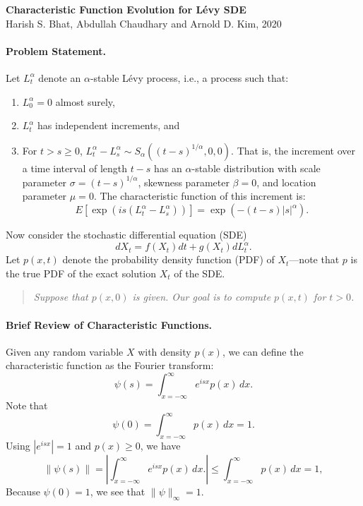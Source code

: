 \documentclass[11pt,letterpaper]{article}
\begin{document}
\begin{center}
\textbf{Characteristic Function Evolution for L\'{e}vy SDE}\\
Harish S. Bhat, Abdullah Chaudhary and Arnold D. Kim, 2020
\end{center}

\paragraph{Problem Statement.} Let $L_t^{\alpha}$ denote an $\alpha$-stable L\'{e}vy process, i.e., a process such that:
\begin{enumerate}
\item $L_0^\alpha = 0$ almost surely,
\item $L_t^\alpha$ has independent increments, and
\item For $t > s \geq 0$, $L_t^\alpha - L_s^\alpha \sim S_\alpha((t-s)^{1/\alpha},0,0)$.  That is, the increment over a time interval of length $t-s$ has an $\alpha$-stable distribution with scale parameter $\sigma = (t-s)^{1/\alpha}$, skewness parameter $\beta=0$, and location parameter $\mu=0$.  The characteristic function of this increment is:
\begin{equation}
\label{eqn:cfinc}
E[\exp(i s (L_t^\alpha - L_s^\alpha))] = \exp(-(t-s) |s|^\alpha).
\end{equation}
\end{enumerate}

\noindent Now consider the stochastic differential equation (SDE)
\begin{equation}
\label{eqn:sde}
dX_t = f(X_t) dt + g(X_t) dL_t^{\alpha}.
\end{equation}
Let $p(x,t)$ denote the probability density function (PDF) of $X_t$---note that $p$ is the true PDF of the exact solution $X_t$ of the SDE.

\begin{quote}
\emph{Suppose that $p(x,0)$ is given.  Our goal is to compute $p(x,t)$ for $t > 0$.}
\end{quote}

\paragraph{Brief Review of Characteristic Functions.} Given any random variable $X$ with density $p(x)$, we can define the characteristic function as the Fourier transform:
\[
\psi(s) = \int_{x=-\infty}^\infty e^{i s x} p(x) \, dx.
\]
Note that
\[
\psi(0) = \int_{x=-\infty}^\infty p(x) \, dx = 1.
\]
Using $|e^{i s x}| = 1$ and $p(x) \geq 0$, we have
\[
\| \psi(s) \| = \left| \int_{x=-\infty}^\infty e^{i s x} p(x) \, dx. \right| \leq \int_{x=-\infty}^\infty p(x) \, dx = 1,
\]
Because $\psi(0) = 1$, we see that $\|\psi \|_\infty = 1$.
\end{document}
